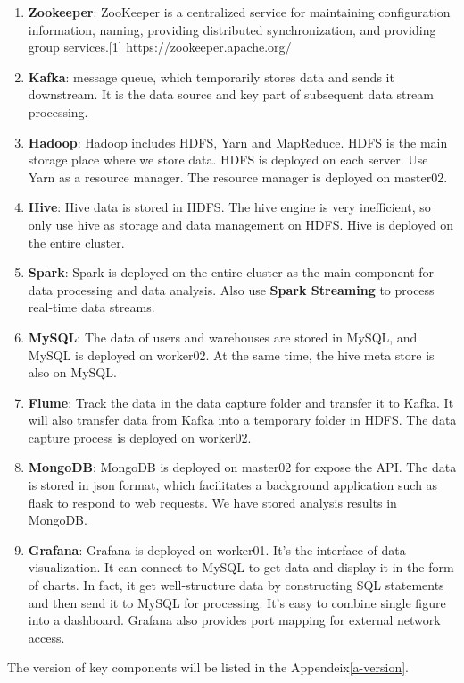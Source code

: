 \begin{enumerate}
    \item \textbf{Zookeeper}: ZooKeeper is a centralized service for maintaining configuration information, naming, providing distributed synchronization, and providing group services.[1] https://zookeeper.apache.org/
    \item \textbf{Kafka}: message queue, which temporarily stores data and sends it downstream. It is the data source and key part of subsequent data stream processing.
    \item \textbf{Hadoop}: Hadoop includes HDFS, Yarn and MapReduce. HDFS is the main storage place where we store data. HDFS is deployed on each server. Use Yarn as a resource manager. The resource manager is deployed on master02.
    \item \textbf{Hive}: Hive data is stored in HDFS. The hive engine is very inefficient, so only use hive as storage and data management on HDFS. Hive is deployed on the entire cluster.
    \item \textbf{Spark}: Spark is deployed on the entire cluster as the main component for data processing and data analysis. Also use \textbf{Spark Streaming} to process real-time data streams.
    \item \textbf{MySQL}: The data of users and warehouses are stored in MySQL, and MySQL is deployed on worker02. At the same time, the hive meta store is also on MySQL.
    \item \textbf{Flume}: Track the data in the data capture folder and transfer it to Kafka. It will also transfer data from Kafka into a temporary folder in HDFS. The data capture process is deployed on worker02.
    \item \textbf{MongoDB}: MongoDB is deployed on master02 for expose the API. The data is stored in json format, which facilitates a background application such as flask to respond to web requests. We have stored analysis results in MongoDB.
    \item \textbf{Grafana}: Grafana is deployed on worker01. It's the interface of data visualization. It can connect to MySQL to get data and display it in the form of charts. In fact, it get well-structure data by constructing SQL statements and then send it to MySQL for processing. It's easy to combine single figure into a  dashboard. Grafana also provides port mapping for external network access.
\end{enumerate}


The version of key components will be listed in the Appendeix\ref{a-version}.




